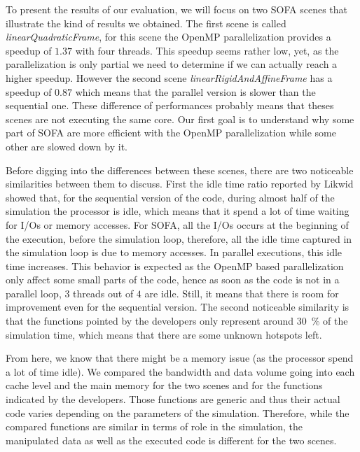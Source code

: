 To present the results of our evaluation, we will focus on two \gls{SOFA} scenes that illustrate the kind of results we obtained.
The first scene is called \emph{linearQuadraticFrame}, for this scene the \gls{OpenMP} parallelization provides a speedup of $1.37$ with four threads.
This speedup seems rather low, yet, as the parallelization is only partial we need to determine if we can actually reach a higher speedup.
However the second scene \emph{linearRigidAndAffineFrame} has a speedup of $0.87$ which means that the parallel version is slower than the sequential one.
These difference of performances probably means that theses scenes are not executing the same core.
Our first goal is to understand why some part of \gls{SOFA} are more efficient with the \gls{OpenMP} parallelization while some other are slowed down by it.

Before digging into the differences between these scenes, there are two noticeable similarities between them to discuss.
First the idle time ratio reported by \gls{Likwid} showed that, for the sequential version of the code, during almost half of the simulation the processor is idle, which means that it spend a lot of time waiting for \glspl{I/O} or memory accesses.
For \gls{SOFA}, all the \glspl{I/O} occurs at the beginning of the execution, before the simulation loop, therefore, all the idle time captured in the simulation loop is due to memory accesses.
In parallel executions,  this idle time increases.
This behavior is expected as the \gls{OpenMP} based parallelization only affect some small parts of the code, hence as soon as the code is not in a parallel loop, $3$ threads out of $4$ are idle.
Still, it means that there is room for improvement even for the sequential version.
The second noticeable similarity is that the functions pointed by the developers only represent around \SI{30}{\%} of the simulation time, which means that there are some unknown hotspots left.

From here, we know that there might be a memory issue (as the processor spend a lot of time idle).
We compared the bandwidth and data volume going into each cache level and the main memory for the two scenes and for the functions indicated by the developers.
Those functions are generic and thus their actual code varies depending on the parameters of the simulation.
Therefore, while the compared functions are similar in terms of role in the simulation, the manipulated data as well as the executed code is different for the two scenes.

